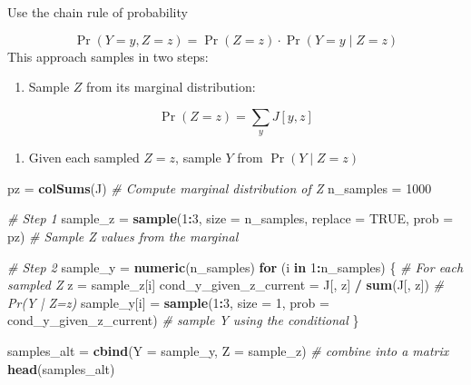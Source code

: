 \documentclass[
]{article}
\newenvironment{Shaded}{\begin{snugshade}}{\end{snugshade}}
\newcommand{\AttributeTok}[1]{\textcolor[rgb]{0.13,0.29,0.53}{#1}}
\newcommand{\CommentTok}[1]{\textcolor[rgb]{0.56,0.35,0.01}{\textit{#1}}}
\newcommand{\ConstantTok}[1]{\textcolor[rgb]{0.56,0.35,0.01}{#1}}
\newcommand{\ControlFlowTok}[1]{\textcolor[rgb]{0.13,0.29,0.53}{\textbf{#1}}}
\newcommand{\DecValTok}[1]{\textcolor[rgb]{0.00,0.00,0.81}{#1}}
\newcommand{\FunctionTok}[1]{\textcolor[rgb]{0.13,0.29,0.53}{\textbf{#1}}}
\newcommand{\NormalTok}[1]{#1}
\newcommand{\OtherTok}[1]{\textcolor[rgb]{0.56,0.35,0.01}{#1}}
\newcommand{\SpecialCharTok}[1]{\textcolor[rgb]{0.81,0.36,0.00}{\textbf{#1}}}
\providecommand{\tightlist}{%
  \setlength{\itemsep}{0pt}\setlength{\parskip}{0pt}}
\begin{document}
Use the chain rule of probability

\[
\Pr(Y = y, Z = z) = \Pr(Z = z) \cdot \Pr(Y = y \mid Z = z)
\] This approach samples in two steps:

\begin{enumerate}
\def\labelenumi{\arabic{enumi}.}
\tightlist
\item
  Sample \(Z\) from its marginal distribution:
\end{enumerate}

\[
\Pr(Z = z) = \sum_y J[y, z]
\]

\begin{enumerate}
\def\labelenumi{\arabic{enumi}.}
\setcounter{enumi}{1}
\tightlist
\item
  Given each sampled \(Z = z\), sample \(Y\) from \(\Pr(Y \mid Z = z)\)
\end{enumerate}

\begin{Shaded}
\begin{Highlighting}[]
\NormalTok{pz }\OtherTok{=} \FunctionTok{colSums}\NormalTok{(J) }\CommentTok{\# Compute marginal distribution of Z}
\NormalTok{n\_samples }\OtherTok{=} \DecValTok{1000}

\CommentTok{\# Step 1}
\NormalTok{sample\_z }\OtherTok{=} \FunctionTok{sample}\NormalTok{(}\DecValTok{1}\SpecialCharTok{:}\DecValTok{3}\NormalTok{, }\AttributeTok{size =}\NormalTok{ n\_samples, }\AttributeTok{replace =} \ConstantTok{TRUE}\NormalTok{, }\AttributeTok{prob =}\NormalTok{ pz) }\CommentTok{\# Sample Z values from the marginal}

\CommentTok{\# Step 2}
\NormalTok{sample\_y }\OtherTok{=} \FunctionTok{numeric}\NormalTok{(n\_samples)}
\ControlFlowTok{for}\NormalTok{ (i }\ControlFlowTok{in} \DecValTok{1}\SpecialCharTok{:}\NormalTok{n\_samples) \{ }\CommentTok{\# For each sampled Z}
\NormalTok{  z }\OtherTok{=}\NormalTok{ sample\_z[i]}
\NormalTok{  cond\_y\_given\_z\_current }\OtherTok{=}\NormalTok{ J[, z] }\SpecialCharTok{/} \FunctionTok{sum}\NormalTok{(J[, z])  }\CommentTok{\# Pr(Y | Z=z)}
\NormalTok{  sample\_y[i] }\OtherTok{=} \FunctionTok{sample}\NormalTok{(}\DecValTok{1}\SpecialCharTok{:}\DecValTok{3}\NormalTok{, }\AttributeTok{size =} \DecValTok{1}\NormalTok{, }\AttributeTok{prob =}\NormalTok{ cond\_y\_given\_z\_current) }\CommentTok{\# sample Y using the conditional}
\NormalTok{\}}

\NormalTok{samples\_alt }\OtherTok{=} \FunctionTok{cbind}\NormalTok{(}\AttributeTok{Y =}\NormalTok{ sample\_y, }\AttributeTok{Z =}\NormalTok{ sample\_z) }\CommentTok{\# combine into a matrix}
\FunctionTok{head}\NormalTok{(samples\_alt)}
\end{Highlighting}
\end{Shaded}
\end{document}
